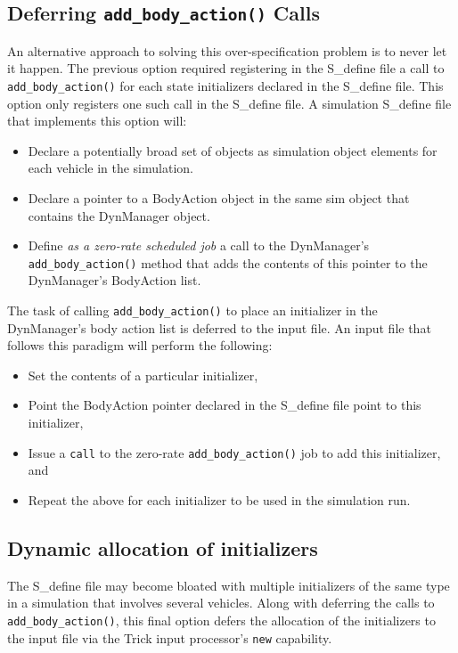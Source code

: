 \subsection*{Deferring {\tt add\_body\_action()} Calls}
An alternative approach to solving this over-specification problem is to
never let it happen. The previous option required registering
in the S\_define file a call to {\tt add\_body\_action()}
for each state initializers declared in the S\_define file.
This option only registers one such call in the S\_define file.
A simulation S\_define file that implements this option will:
\begin{itemize}
\item Declare a potentially broad set of \ModelDesc objects as
simulation object elements for each vehicle in the simulation.
\item Declare a pointer to a BodyAction object in the same sim object
that contains the DynManager object.
\item Define {\em as a zero-rate scheduled job} a call to the DynManager's
{\tt add\_body\_action()} method that adds the contents of this pointer
to the DynManager's BodyAction list.
\end{itemize}

The task of calling {\tt add\_body\_action()} to place an initializer
in the DynManager's body action list is deferred to the input file.
An input file that follows this paradigm will
perform the following:
\begin{itemize}
\item Set the contents of a particular initializer,
\item Point the BodyAction pointer declared in
the S\_define file point to this initializer,
\item Issue a {\tt call} to the zero-rate
{\tt add\_body\_action()} job to add this initializer, and
\item Repeat the above for each initializer to be used in
the simulation run.
\end{itemize}

\subsection*{Dynamic allocation of initializers}
The S\_define file may become bloated with multiple initializers of the
same type in a simulation that involves several vehicles.
Along with deferring the calls to {\tt add\_body\_action()},
this final option defers the allocation of the initializers
to the input file via the Trick input processor's {\tt new} capability.

